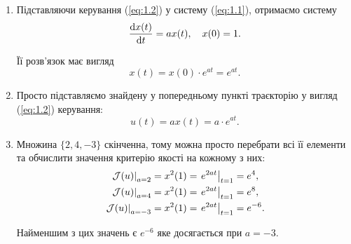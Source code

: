 \begin{solution}
	\begin{enumerate}
		\item Підставляючи керування (\ref{eq:1.2}) у систему (\ref{eq:1.1}), отримаємо систему \[ \frac{\mathop{}\!\mathrm{d} x(t)}{\mathop{}\!\mathrm{d} t} = a x(t), \quad x(0) = 1. \]

		Її розв'язок має вигляд \[ x(t) = x(0) \cdot e^{a t} = e^{a t}. \]

		\item Просто підставляємо знайдену у попередньому пункті траєкторію у вигляд (\ref{eq:1.2}) керування: \[ u(t) = a x(t) = a \cdot e^{a t}. \]

		\item Множина $\{2, 4, -3\}$ скінченна, тому можна просто перебрати всі її елементи та обчислити значення критерію якості на кожному з них: \[ \begin{aligned} \left. \mathcal{J} (u) \right|_{a = 2} &= x^2 (1) = \left. e^{2 a t} \right|_{t = 1} = e^4, \\ \left. \mathcal{J} (u) \right|_{a = 4} &= x^2 (1) = \left. e^{2 a t} \right|_{t = 1} = e^8, \\ \left. \mathcal{J} (u) \right|_{a = -3} &= x^2 (1) = \left. e^{2 a t} \right|_{t = 1} = e^{-6}. \end{aligned} \]

		Найменшим з цих значень є $e^{-6}$ яке досягається при $a = -3$. \\

	\end{enumerate}
\end{solution}


